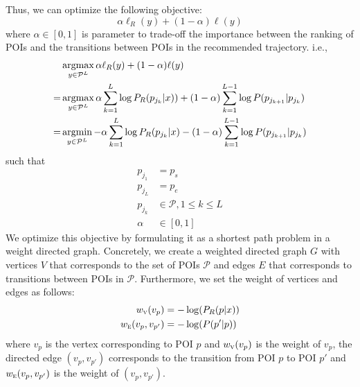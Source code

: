Thus, we can optimize the following objective:
\begin{displaymath}
    \alpha \ell_R(y) + (1-\alpha) \ell(y)
\end{displaymath}
where $\alpha \in [0, 1]$ is parameter to trade-off the importance between the ranking of POIs
and the transitions between POIs in the recommended trajectory.
i.e.,
\begin{align*}
    & \operatorname*{argmax}_{y \in \mathcal{P}^L} \alpha \ell_R(y) + (1-\alpha) \ell(y) \\
   =& \operatorname*{argmax}_{y \in \mathcal{P}^L} \alpha \sum_{k=1}^L \log P_R(p_{j_k} | x)) +
      (1-\alpha) \sum_{k=1}^{L-1} \log P(p_{j_{k+1}} | p_{j_k}) \\
   =& \operatorname*{argmin}_{y \in \mathcal{P}^L} - \alpha \sum_{k=1}^L \log P_R(p_{j_k} | x) -
      (1-\alpha) \sum_{k=1}^{L-1} \log P(p_{j_{k+1}} | p_{j_k})
\end{align*}
such that
\begin{align*}
    p_{j_1} &= p_s \\
    p_{j_L} &= p_e \\
    p_{j_k} &\in \mathcal{P}, 1 \le k \le L \\
    \alpha  &\in [0, 1]
\end{align*}
We optimize this objective by formulating it as a shortest path problem in a weight directed graph.
Concretely,
we create a weighted directed graph $G$ with vertices $V$ that corresponds to the set of POIs $\mathcal{P}$ and
edges $E$ that corresponds to transitions between POIs in $\mathcal{P}$.
Furthermore, we set the weight of vertices and edges as follows:
\begin{align*}
    w_{\textsc{v}}(v_{p})       & = -\log(P_R(p | x)) \\
    w_{\textsc{e}}(v_p, v_{p'}) & = -\log(P(p' | p))
\end{align*}
where $v_{p}$ is the vertex corresponding to POI $p$ and $w_{\textsc{v}}(v_{p})$ is the weight of $v_{p}$,
the directed edge $(v_p, v_{p'})$ corresponds to the transition from POI $p$ to POI $p'$ and
$w_{\textsc{e}}(v_p, v_{p'})$ is the weight of $(v_p, v_{p'})$.

